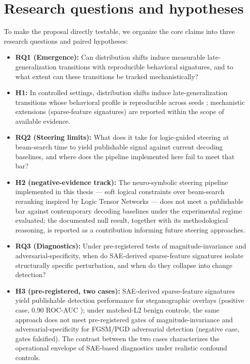 ﻿\documentclass[../ppgc-tese.tex]{subfiles}
\begin{document}
\section{Research questions and hypotheses}
To make the proposal directly testable, we organize the core claims into three research questions and paired hypotheses:
\begin{itemize}
    \item \textbf{RQ1 (Emergence):} Can distribution shifts induce measurable late-generalization transitions with reproducible behavioral signatures, and to what extent can these transitions be tracked mechanistically?
    \item \textbf{H1:} In controlled settings, distribution shifts induce late-generalization transitions whose behavioral profile is reproducible across seeds \cite{carvalho2025inducing_grokking_distribution_shifts}; mechanistic extensions (sparse-feature signatures) are reported within the scope of available evidence.

    \item \textbf{RQ2 (Steering limits):} What does it take for logic-guided steering at beam-search time to yield publishable signal against current decoding baselines, and where does the pipeline implemented here fail to meet that bar?
    \item \textbf{H2 (negative-evidence track):} The neuro-symbolic steering pipeline implemented in this thesis --- soft logical constraints over beam-search reranking inspired by Logic Tensor Networks \cite{Garcez2009,serafini2016ltn} --- does not meet a publishable bar against contemporary decoding baselines under the experimental regime evaluated; the documented null result, together with its methodological reasoning, is reported as a contribution informing future steering approaches.

    \item \textbf{RQ3 (Diagnostics):} Under pre-registered tests of magnitude-invariance and adversarial-specificity, when do SAE-derived sparse-feature signatures isolate structurally specific perturbation, and when do they collapse into change detection?
    \item \textbf{H3 (pre-registered, two cases):} SAE-derived sparse-feature signatures yield publishable detection performance for steganographic overlays (positive case, 0.90 ROC-AUC \cite{carvalho2026interpretable_stego_detection_sae}); under matched-L2 benign controls, the same approach does not meet pre-registered gates of magnitude-invariance and adversarial-specificity for FGSM/PGD adversarial detection (negative case, gates falsified). The contrast between the two cases characterizes the operational envelope of SAE-based diagnostics under realistic confound controls.
\end{itemize}
\end{document}
